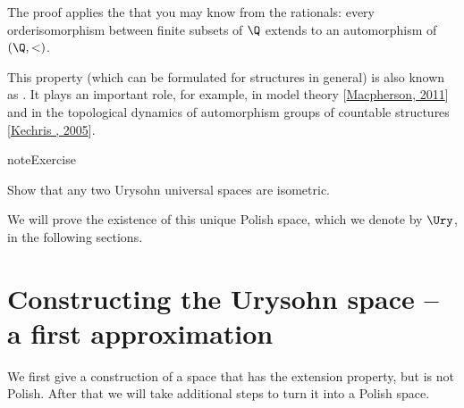 \documentclass[letterpaper,10pt,english]{jupyterBook}
\begin{document}
\sphinxAtStartPar
The proof applies the  that you may know from the rationals: every order\sphinxhyphen{}isomorphism between finite subsets of \(\Q\) extends to an automorphism of \((\Q,<)\).

\sphinxAtStartPar
This property (which can be formulated for structures in general) is also known as . It plays an important role, for example, in
model theory {[}\hyperlink{cite.bibliography:id12}{Macpherson, 2011}{]} and in the topological dynamics of automorphism groups of countable structures {[}\hyperlink{cite.bibliography:id11}{Kechris , 2005}{]}.

\begin{sphinxadmonition}{note}{Exercise}

\sphinxAtStartPar
Show that any two Urysohn universal spaces are isometric.
\end{sphinxadmonition}

\sphinxAtStartPar
We will prove the existence of this unique Polish space, which we denote by \(\Ury\), in the following sections.


\section{Constructing the Urysohn space – a first approximation}
\label{\detokenize{Urysohn:constructing-the-urysohn-space-a-first-approximation}}
\sphinxAtStartPar
We first give a construction of a space that has the extension property, but is not Polish. After that we will take additional steps to turn it into a Polish space.
\end{document}
